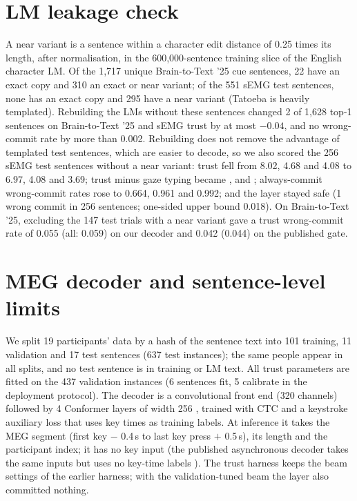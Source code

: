 \section{LM leakage check}
\label{app:leakage}

A near variant is a sentence within a character edit distance of 0.25 times its length, after normalisation, in the 600,000-sentence training slice of the English character LM. Of the 1,717 unique Brain-to-Text '25 cue sentences, 22 have an exact copy and 310 an exact or near variant; of the 551 sEMG test sentences, none has an exact copy and 295 have a near variant (Tatoeba is heavily templated). Rebuilding the LMs without these sentences changed 2 of 1,628 top-1 sentences on Brain-to-Text '25 and sEMG trust \ewpm{} by at most $-0.04$, and no wrong-commit rate by more than 0.002. Rebuilding does not remove the advantage of templated test sentences, which are easier to decode, so we also scored the 256 sEMG test sentences without a near variant: trust \ewpm{} fell from 8.02, 4.68 and 4.08 to 6.97, 4.08 and 3.69; trust minus gaze typing became ,  and ; always-commit wrong-commit rates rose to 0.664, 0.961 and 0.992; and the layer stayed safe (1 wrong commit in 256 sentences; one-sided upper bound 0.018). On Brain-to-Text '25, excluding the 147 test trials with a near variant gave a trust wrong-commit rate of 0.055 (all: 0.059) on our decoder and 0.042 (0.044) on the published gate.

\section{MEG decoder and sentence-level limits}
\label{app:meg}

We split 19 participants' data by a hash of the sentence text into 101 training, 11 validation and 17 test sentences (637 test instances); the same people appear in all splits, and no test sentence is in training or LM text. All trust parameters are fitted on the 437 validation instances (6 sentences fit, 5 calibrate in the deployment protocol). The decoder is a convolutional front end (320 channels) followed by 4 Conformer layers of width 256 \citep{gulati2020conformer}, trained with CTC and a keystroke auxiliary loss that uses key times as training labels. At inference it takes the MEG segment (first key $-$ 0.4\,s to last key press $+$ 0.5\,s), its length and the participant index; it has no key input (the published asynchronous decoder takes the same inputs but uses no key-time labels \citep{zhang2026brain2qwertyv2}). The trust harness keeps the beam settings of the earlier harness; with the validation-tuned beam the layer also committed nothing.

